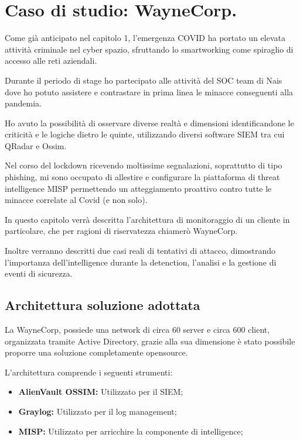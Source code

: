 \chapter{Caso di studio: WayneCorp.}
\label{chap:Caso d'uso: WayneCorp.}

Come già anticipato nel capitolo 1, l’emergenza COVID ha portato un elevata attività criminale nel cyber spazio, sfruttando lo smartworking come spiraglio di accesso alle reti aziendali.\par
Durante il periodo di stage ho partecipato alle attività del SOC team di Nais dove ho potuto assistere e contrastare in prima linea le minacce conseguenti alla pandemia.\par
Ho avuto la possibilità di osservare diverse realtà e dimensioni identificandone le criticità e le logiche dietro le quinte, utilizzando diversi software SIEM tra cui QRadar e Ossim.\par
Nel corso del lockdown ricevendo moltissime segnalazioni, soprattutto di tipo phishing, mi sono occupato di allestire e configurare la piattaforma di threat intelligence MISP permettendo un atteggiamento proattivo contro tutte le minacce correlate al Covid (e non solo).\par
In questo capitolo verrà descritta l’architettura di monitoraggio di un cliente in particolare, che per ragioni di riservatezza chiamerò WayneCorp.\par
Inoltre verranno descritti due casi reali di tentativi di attacco, dimostrando l’importanza dell'intelligence durante la detenction, l’analisi e la gestione di eventi di sicurezza.

\section{Architettura soluzione adottata}


La WayneCorp, possiede una network di circa 60 server e circa 600 client, organizzata tramite Active Directory, grazie alla sua dimensione è stato possibile proporre una soluzione completamente opensource.\par

L’architettura comprende i seguenti strumenti: 
\begin{itemize}
    \item\textbf{AlienVault OSSIM:} Utilizzato per il SIEM;
    \item\textbf{Graylog:} Utilizzato per il log management;
    \item\textbf{MISP:} Utilizzato per arricchire la componente di intelligence;
\end{itemize}

